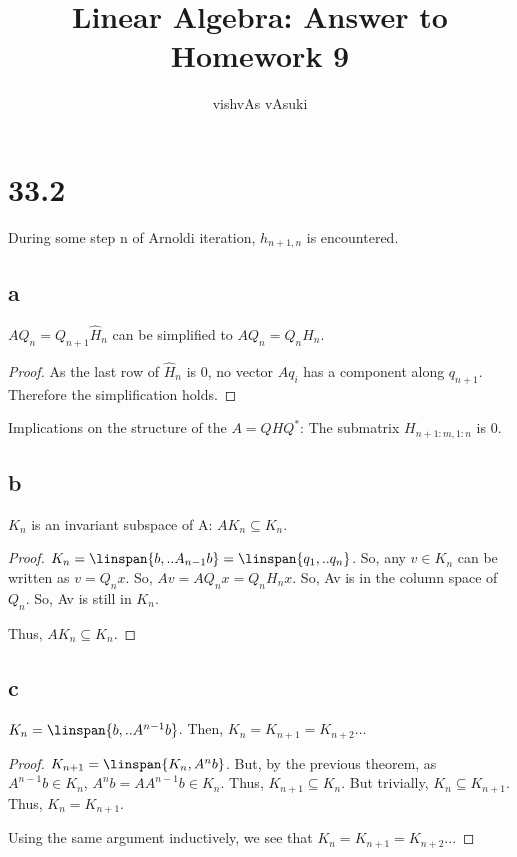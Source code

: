 \documentclass[10pt]{amsart}
\title{Linear Algebra: Answer to Homework 9}
\author{vishvAs vAsuki}
\begin{document}
\maketitle

\section{33.2}
During some step n of Arnoldi iteration, $h_{n+1,n}$ is encountered.

\subsection{a}
\begin{thm}
$AQ_{n} = Q_{n+1}\hat{H}_{n}$ can be simplified to $AQ_{n} = Q_{n}H_{n}$.
\end{thm}
\begin{proof}
As the last row of $\hat{H}_{n}$ is 0, no vector $Aq_{i}$ has a component along $q_{n+1}$. Therefore the simplification holds.
\end{proof}

\begin{rem}
Implications on the structure of the $A = QHQ^{*}$: The submatrix $H_{n+1:m,1:n}$ is 0.
\end{rem}

\subsection{b}
\begin{thm}
 $K_{n}$ is an invariant subspace of A: $AK_{n} \subseteq K_{n}$.
\end{thm}
\begin{proof}
$K_{n} = \linspan{b, .. A_{n-1}b} = \linspan{q_{1}, .. q_{n}}$. So, any $v \in K_{n}$ can be written as $v=Q_{n}x$. So, $Av = AQ_{n}x = Q_{n}H_{n}x$. So, Av is in the column space of $Q_{n}$. So, Av is still in $K_{n}$.

Thus, $AK_{n} \subseteq K_{n}$.
\end{proof}

\subsection{c}
\begin{thm}
 $K_{n} = \linspan{b, .. A^{n-1}b}$. Then, $K_{n} = K_{n+1} = K_{n+2} ..$.
\end{thm}
\begin{proof}
$K_{n+1} = \linspan{K_{n}, A^{n}b}$. But, by the previous theorem, as $A^{n-1}b \in K_{n}$, $A^{n}b = AA^{n-1}b \in K_{n}$. Thus, $K_{n+1} \subseteq K_{n}$. But trivially, $K_{n} \subseteq K_{n+1}$. Thus, $K_{n} = K_{n+1}$.

Using the same argument inductively, we see that $K_{n} = K_{n+1} = K_{n+2} ..$.
\end{proof}
\end{document}
